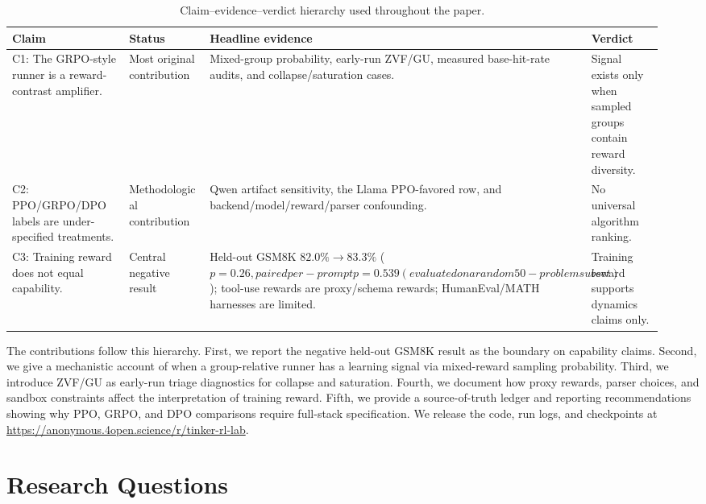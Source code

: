 \documentclass[12pt,a4paper]{report}
\begin{document}
\begin{table}[t]
\centering
\caption{Claim--evidence--verdict hierarchy used throughout the paper.}
\label{tab:claim_evidence_verdict}
\small
\begin{tabular}{@{}p{0.27\linewidth}p{0.18\linewidth}p{0.33\linewidth}p{0.16\linewidth}@{}}
\toprule
\textbf{Claim} & \textbf{Status} & \textbf{Headline evidence} & \textbf{Verdict}\\
\midrule
C1: The GRPO-style runner is a reward-contrast amplifier. & Most original contribution &
Mixed-group probability, early-run ZVF/GU, measured base-hit-rate audits, and collapse/saturation cases. &
Signal exists only when sampled groups contain reward diversity.\\
C2: PPO/GRPO/DPO labels are under-specified treatments. & Methodological contribution &
Qwen artifact sensitivity, the Llama PPO-favored row, and backend/model/reward/parser confounding. &
No universal algorithm ranking.\\
C3: Training reward does not equal capability. & Central negative result &
Held-out GSM8K $82.0\%\!\to\!83.3\%$ ($p=0.26, paired per-prompt p=0.539 (evaluated on a random 50-problem subset)$); tool-use rewards are
proxy/schema rewards; HumanEval/MATH harnesses are limited. &
Training reward supports dynamics claims only.\\
\bottomrule
\end{tabular}
\end{table}

The contributions follow this hierarchy.  First, we report the negative
held-out GSM8K result as the boundary on capability claims.  Second, we give a
mechanistic account of when a group-relative runner has a learning signal via
mixed-reward sampling probability.  Third, we introduce ZVF/GU as early-run
triage diagnostics for collapse and saturation.  Fourth, we document how proxy
rewards, parser choices, and sandbox constraints affect the interpretation of
training reward.  Fifth, we provide a source-of-truth ledger and reporting
recommendations showing why PPO, GRPO, and DPO comparisons require full-stack
specification.  We release the code, run logs, and checkpoints at
\url{https://anonymous.4open.science/r/tinker-rl-lab}.



\section{Research Questions}
\label{sec:research-questions}
\end{document}
